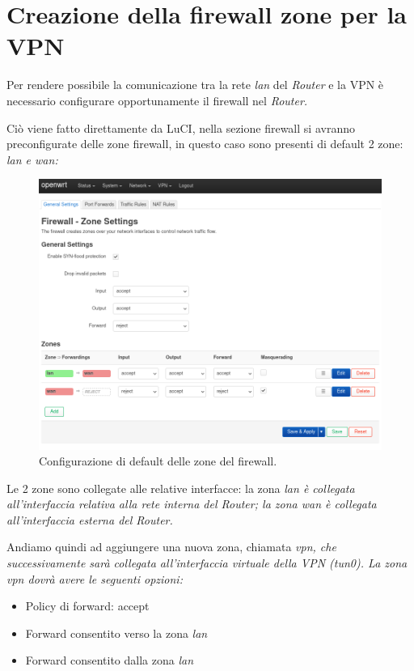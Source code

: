 \section{Creazione della firewall zone per la VPN} 

Per rendere possibile la comunicazione tra la rete \textit{lan} del \textit{Router} e la VPN è necessario configurare opportunamente il firewall nel \it{Router}.

Ciò viene fatto direttamente da LuCI, nella sezione firewall si avranno preconfigurate delle zone firewall, in questo caso sono presenti di default 2 zone: \it{lan} e \it{wan}:

\begin{figure}[H]
    \centering
    \includegraphics[width=1\linewidth]{immagini/LuCI_firewall_init1}
    \caption{Configurazione di default delle zone del firewall.}
    \label{fig:luci-firewall-init}
\end{figure}

Le 2 zone sono collegate alle relative interfacce: la zona \it{lan} è collegata all'interfaccia relativa alla rete interna del \textit{Router}; la zona \it{wan} è collegata all'interfaccia esterna del \textit{Router}. 

Andiamo quindi ad aggiungere una nuova zona, chiamata \it{vpn}, che successivamente sarà collegata all'interfaccia virtuale della VPN (\it{tun0}). La zona \it{vpn} dovrà avere le seguenti opzioni:

\begin{itemize}
    \item Policy di forward: accept
    \item Forward consentito verso la zona \it{lan}
    \item Forward consentito dalla zona \it{lan}
\end{itemize}

